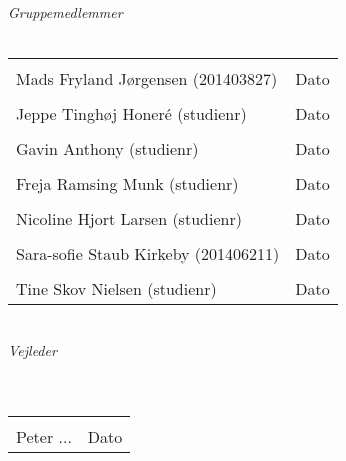 \begin{vplace}[0.6]
{\large \textit{Gruppemedlemmer}}
\\
\\

\noindent \begin{tabular}{ll}
	\makebox[3.0in]{\hrulefill} & \makebox[1.5in]{\hrulefill}\\
	Mads Fryland J\o rgensen (201403827) & Dato\\[7ex]%
	\makebox[3in]{\hrulefill} & \makebox[1.5in]{\hrulefill}\\
	Jeppe Tinghøj Honeré (studienr) & Dato\\[7ex]
	\makebox[3in]{\hrulefill} & \makebox[1.5in]{\hrulefill}\\
	Gavin Anthony (studienr) & Dato\\[7ex]
	\makebox[3in]{\hrulefill} & \makebox[1.5in]{\hrulefill}\\
	Freja Ramsing Munk (studienr) & Dato\\[7ex]
	\makebox[3in]{\hrulefill} & \makebox[1.5in]{\hrulefill}\\
	Nicoline Hjort Larsen (studienr) & Dato\\[7ex]
	\makebox[3in]{\hrulefill} & \makebox[1.5in]{\hrulefill}\\
	Sara-sofie Staub Kirkeby (201406211) & Dato\\[7ex]
	\makebox[3in]{\hrulefill} & \makebox[1.5in]{\hrulefill}\\
	Tine Skov Nielsen (studienr) & Dato\\[7ex]
	
	
\end{tabular}
\\
{\large \textit{Vejleder}}
\\
\\
\\
\noindent \begin{tabular}{ll}
	\makebox[3.0in]{\hrulefill} & \makebox[1.5in]{\hrulefill}\\
	Peter ... & Dato\\[8ex]
\end{tabular}
\end{vplace}
